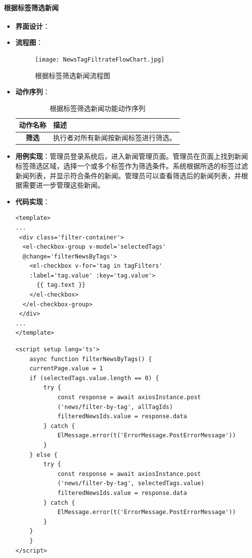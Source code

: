 \paragraph{根据标签筛选新闻}
\begin{itemize}
	\item \textbf{界面设计}：
	\item \textbf{流程图}：
	\begin{figure}[H]
		\centering
		\texttt{[image: NewsTagFiltrateFlowChart.jpg]}
		\caption{根据标签筛选新闻流程图}
		\label{NewsTagFiltrateFlowChart}
	\end{figure}
	\item \textbf{动作序列}：
	\begin{table}[H]
		\centering
		\caption{根据标签筛选新闻功能动作序列}
		\renewcommand\arraystretch{1.5}
		\begin{tabular}{|c|>{\raggedright\arraybackslash}p{10cm}|}
			\hline
			\textbf{动作名称} & \textbf{描述} \\ \hline
			\textbf{筛选} & 执行者对所有新闻按新闻标签进行筛选。 \\ \hline
		\end{tabular}
	\end{table}
	\item \textbf{用例实现}：管理员登录系统后，进入新闻管理页面。管理员在页面上找到新闻标签筛选区域，选择一个或多个标签作为筛选条件。系统根据所选的标签过滤新闻列表，并显示符合条件的新闻。管理员可以查看筛选后的新闻列表，并根据需要进一步管理这些新闻。
	\item \textbf{代码实现}：
	\begin{verbatim}
<template>
...
 <div class='filter-container'>
  <el-checkbox-group v-model='selectedTags' 
  @change='filterNewsByTags'>
    <el-checkbox v-for='tag in tagFilters' 
    :label='tag.value' :key='tag.value'>
      {{ tag.text }}
    </el-checkbox>
  </el-checkbox-group>
 </div>
...
</template>
	\end{verbatim}
	
	\begin{verbatim}
<script setup lang='ts'>
	async function filterNewsByTags() {
	currentPage.value = 1
	if (selectedTags.value.length == 0) {
		try {
			const response = await axiosInstance.post
			('news/filter-by-tag', allTagIds)
			filteredNewsIds.value = response.data
		} catch {
			ElMessage.error(t('ErrorMessage.PostErrorMessage'))
		}
	} else {
		try {
			const response = await axiosInstance.post
			('news/filter-by-tag', selectedTags.value)
			filteredNewsIds.value = response.data
		} catch {
			ElMessage.error(t('ErrorMessage.PostErrorMessage'))
		}
	}
	}
</script>
	\end{verbatim}
\end{itemize}

